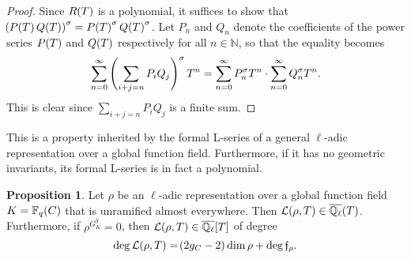 \documentclass{article}
\theoremstyle{definition}
\newtheorem{proposition}[n]{Proposition}
\theoremstyle{definition}
\newcommand{\FF}{\mathbb{F}}
\newcommand{\ffff}{\mathfrak{f}}
\newcommand{\LLL}{\mathcal{L}}
\newcommand{\NN}{\mathbb{N}}
\newcommand{\QQ}{\mathbb{Q}}
\newcommand{\br}{\!\del[0]}
\begin{document}
\begin{proof}
Since $ R\br{T} $ is a polynomial, it suffices to show that $ \br{P\br{T}Q\br{T}}^\sigma = P\br{T}^\sigma Q\br{T}^\sigma $. Let $ P_n $ and $ Q_n $ denote the coefficients of the power series $ P\br{T} $ and $ Q\br{T} $ respectively for all $ n \in \NN $, so that the equality becomes
$$ \sum_{n = 0}^\infty \del[4]{\sum_{i + j = n} P_iQ_j}^\sigma T^n = \sum_{n = 0}^\infty P_n^\sigma T^n \cdot \sum_{n = 0}^\infty Q_n^\sigma T^n. $$
This is clear since $ \sum_{i + j = n} P_iQ_j $ is a finite sum.
\end{proof}

This is a property inherited by the formal L-series of a general $ \ell $-adic representation over a global function field. Furthermore, if it has no geometric invariants, its formal L-series is in fact a polynomial.

\begin{proposition}
\label{prop:rationality}
Let $ \rho $ be an $ \ell $-adic representation over a global function field $ K = \FF_q\br{C} $ that is unramified almost everywhere. Then $ \LLL\br{\rho, T} \in \overline{\QQ_\ell}\br{T} $. Furthermore, if $ \rho^{G_K^g} = 0 $, then $ \LLL\br{\rho, T} \in \overline{\QQ_\ell}\sbr{T} $ of degree
$$ \deg\LLL\br{\rho, T} = \br{2g_C - 2}\dim\rho + \deg\ffff_\rho. $$
\end{proposition}
\end{document}
